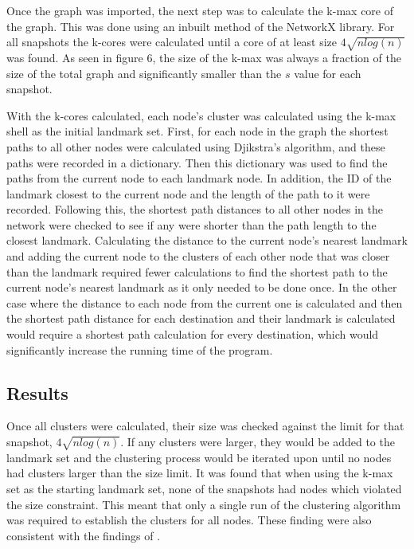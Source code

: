 \documentclass{dissertation/mpaper}
\begin{document}
Once the graph was imported, the next step was to calculate the k-max core of the graph. This was done using an inbuilt method of the NetworkX library. For all snapshots the k-cores were calculated until a core of at least size $4\sqrt{nlog(n)}$ was found. As seen in figure 6, the size of the k-max was always a fraction of the size of the total graph and significantly smaller than the $s$ value for each snapshot. 

With the k-cores calculated, each node's cluster was calculated using the k-max shell as the initial landmark set. First, for each node in the graph the shortest paths to all other nodes were calculated using Djikstra's algorithm, and these paths were recorded in a dictionary. Then this dictionary was used to find the paths from the current node to each landmark node. In addition, the ID of the landmark closest to the current node and the length of the path to it were recorded. Following this, the shortest path distances to all other nodes in the network were checked to see if any were shorter than the path length to the closest landmark. Calculating the distance to the current node's nearest landmark and adding the current node to the clusters of each other node that was closer than the landmark required fewer calculations to find the shortest path to the current node's nearest landmark as it only needed to be done once. In the other case where the distance to each node from the current one is calculated and then the shortest path distance for each destination and their landmark is calculated would require a shortest path calculation for every destination, which would significantly increase the running time of the program. 

\subsection{Results}

Once all clusters were calculated, their size was checked against the limit for that snapshot, $4\sqrt{nlog(n)}$. If any clusters were larger, they would be added to the landmark set and the clustering process would be iterated upon until no nodes had clusters larger than the size limit. It was found that when using the k-max set as the starting landmark set, none of the snapshots had nodes which violated the size constraint. This meant that only a single run of the clustering algorithm was required to establish the clusters for all nodes. These finding were also consistent with the findings of \cite{strowes}. 
\end{document}
